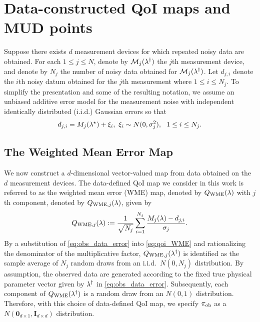 \section{Data-constructed QoI maps and MUD points}\label{sec:data-maps}

Suppose there exists $d$ measurement devices for which repeated noisy data are obtained.
For each $1\leq j\leq N$, denote by $\mathcal{M}_j(\lambda^\dagger)$ the $j$th measurement device, and denote by $N_j$ the number of noisy data obtained for $\mathcal{M}_j(\lambda^\dagger)$.
Let $d_{j,i}$ denote the $i$th noisy datum obtained for the $j$th measurement where $1\leq i\leq N_j$.
To simplify the presentation and some of the resulting notation, we assume an unbiased additive error model for the measurement noise with independent identically distributed (i.i.d.) Gaussian errors so that
\begin{equation}\label{eq:obs_data_error}
	d_{j,i} = M_j(\param^\star) + \xi_i, \ \xi_i\sim N(0,\sigma_j^2), \ \ 1\leq i\leq N_j.
\end{equation}

\subsection{The Weighted Mean Error Map}

We now construct a $d$-dimensional vector-valued map from data obtained on the $d$ measurement devices.
The data-defined QoI map we consider in this work is referred to as the weighted mean error (WME) map, denoted by $Q_\text{WME}(\lambda)$ with $j$th component, denoted by $Q_{\text{WME},j}(\lambda)$, given by
\begin{equation}\label{eq:qoi_WME}
	Q_{\text{WME},j}(\lambda) := \frac{1}{\sqrt{N_j}} \sum_{i=1}^{N_j} \frac{M_j(\lambda)-d_{j,i}}{\sigma_j}.
\end{equation}
By a substitution of \eqref{eq:obs_data_error} into \eqref{eq:qoi_WME} and rationalizing the denominator of the multiplicative factor, $Q_{\text{WME},j}(\lambda^\dagger)$ is identified as the sample average of $N_j$ random draws from an i.i.d.~$N(0,N_j)$ distribution.
By assumption, the observed data are generated according to the fixed true physical parameter vector given by $\lambda^\dagger$ in \eqref{eq:obs_data_error}.
Subsequently, each component of $Q_\text{WME}(\lambda^\dagger)$ is a random draw from an $N(0,1)$ distribution.
Therefore, with this choice of data-defined QoI map, we specify $\operatorname*{\pi_{ob}}$ as a $N(\mathbf{0}_{d\times 1},\mathbf{I}_{d\times d})$ distribution.


